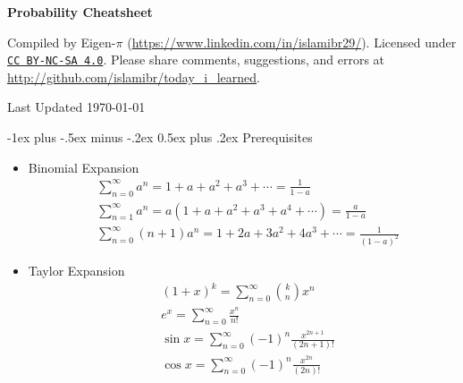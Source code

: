 \documentclass[10pt,landscape]{article}
\makeatletter
\renewcommand{\section}{\@startsection{section}{1}{0mm}%
                                {-1ex plus -.5ex minus -.2ex}%
                                {0.5ex plus .2ex}%
                                {\normalfont\large\bfseries}}
\makeatother
\begin{document}
\raggedright
\footnotesize
\begin{multicols*}{3}

\setlength{\premulticols}{1pt}
\setlength{\postmulticols}{1pt}
\setlength{\multicolsep}{1pt}
\setlength{\columnsep}{2pt}


\begin{center}
    {\color{blue} \Large{\textbf{Probability Cheatsheet}}} \\
\end{center}


\scriptsize

Compiled by Eigen-$\pi$ (\url{https://www.linkedin.com/in/islamibr29/}).  Licensed under \texttt{\href{http://creativecommons.org/licenses/by-nc-sa/4.0/}{CC BY-NC-SA 4.0}}. Please share comments, suggestions, and errors at \url{http://github.com/islamibr/today_i_learned}.

\begin{center}
    Last Updated \today
\end{center}


\section{Prerequisites}
\begin{itemize}
    \item Binomial Expansion $$
\begin{aligned}
& \sum_{n=0}^{\infty} a^n = 1+a+a^2+a^3+\cdots=\frac{1}{1-a} \\
& \sum_{n=1}^{\infty} a^n = a(1+a+a^2+a^3+a^4+\cdots)=\frac{a}{1-a} \\
& \sum_{n=0}^{\infty} (n+1)a^n = 1+2 a+3 a^2+4 a^3+\cdots=\frac{1}{(1-a)^2}
\end{aligned}
$$
    \item Taylor Expansion$$
\begin{aligned}
& (1+x)^k = \sum_{n=0}^{\infty} \binom{k}{n} x^n \\
& e^x=\sum_{n=0}^{\infty} \frac{x^n}{n !} \\
& \sin x=\sum_{n=0}^{\infty}(-1)^n \frac{x^{2 n+1}}{(2 n+1) !} \\ & \cos x=\sum_{n=0}^{\infty}(-1)^n \frac{x^{2 n}}{(2 n) !} \\
\end{aligned}
$$
    

\end{itemize}
\end{multicols*}
\end{document}
